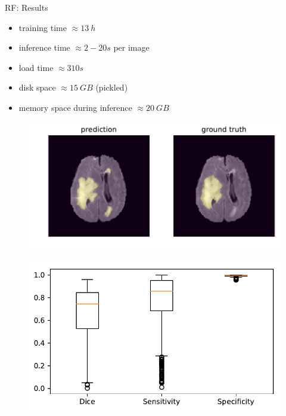 \documentclass[final]{beamer}
\newlength{\onecolwid}
\newlength{\twocolwid}
\begin{document}
\begin{frame}[t]
\begin{columns}[t]
\begin{column}{\twocolwid}

\begin{columns}[t,totalwidth=\twocolwid] %

\begin{column}{\onecolwid} %

\begin{block}{RF: Results}
\begin{itemize}[label={}]
\item training time $\approx \SI{13}{h}$
\item inference time $\approx \si{2-20}{s}$ per image
\item load time $\approx \si{310}{s}$
\item disk space $\approx \SI{15}{GB}$ (pickled)
\item memory space during inference $\approx \SI{20}{GB}$
\end{itemize}
\begin{figure}
\includegraphics[width=0.7\linewidth]{rf_prediction_84}
\end{figure}
\begin{figure}
\includegraphics[width=0.68\linewidth]{boxplot_rf}
\end{figure}
\end{block}



\end{column}
\end{columns}
\end{column}
\end{columns}
\end{frame}
\end{document}
